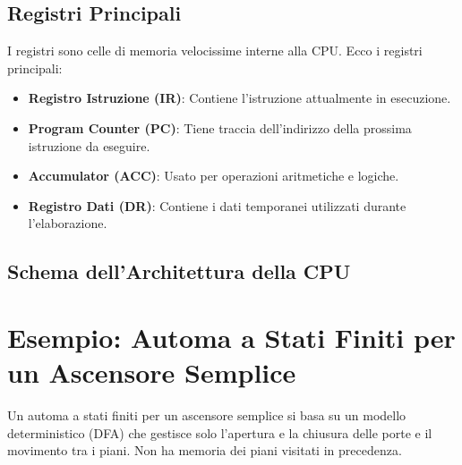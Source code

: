 \documentclass[a4paper,12pt]{report}
\begin{document}
\subsection*{Registri Principali}
I registri sono celle di memoria velocissime interne alla CPU. Ecco i registri principali:
\begin{itemize}
    \item \textbf{Registro Istruzione (IR)}: Contiene l'istruzione attualmente in esecuzione.
    \item \textbf{Program Counter (PC)}: Tiene traccia dell'indirizzo della prossima istruzione da eseguire.
    \item \textbf{Accumulator (ACC)}: Usato per operazioni aritmetiche e logiche.
    \item \textbf{Registro Dati (DR)}: Contiene i dati temporanei utilizzati durante l'elaborazione.
\end{itemize}

\subsection*{Schema dell'Architettura della CPU}
\begin{center}
\end{center}
\newpage

\section*{Esempio: Automa a Stati Finiti per un Ascensore Semplice}
Un automa a stati finiti per un ascensore semplice si basa su un modello deterministico (DFA) che gestisce solo l'apertura e la chiusura delle porte e il movimento tra i piani. Non ha memoria dei piani visitati in precedenza.
\end{document}
